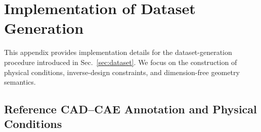 





\section{Implementation of Dataset Generation}
\label{app:dataset}

This appendix provides implementation details for the dataset-generation
procedure introduced in Sec.~\ref{sec:dataset}. We focus on the construction
of physical conditions, inverse-design constraints, and dimension-free
geometry semantics. 

\subsection{Reference CAD--CAE Annotation and Physical Conditions}
\label{app:dataset_annotation}

